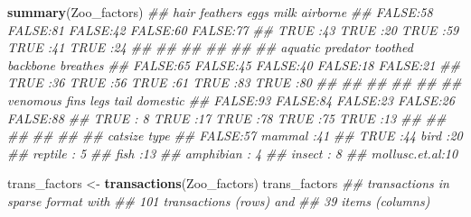 \documentclass[
  notitlepage]{book}
\newenvironment{Shaded}{\begin{snugshade}}{\end{snugshade}}
\newcommand{\CommentTok}[1]{\textcolor[rgb]{0.56,0.35,0.01}{\textit{#1}}}
\newcommand{\KeywordTok}[1]{\textcolor[rgb]{0.13,0.29,0.53}{\textbf{#1}}}
\newcommand{\NormalTok}[1]{#1}
\newcommand{\StringTok}[1]{\textcolor[rgb]{0.31,0.60,0.02}{#1}}
\begin{document}
\begin{Shaded}
\begin{Highlighting}[]
\KeywordTok{summary}\NormalTok{(Zoo\_factors)}
\CommentTok{\#\#     hair     feathers     eggs       milk     airborne }
\CommentTok{\#\#  FALSE:58   FALSE:81   FALSE:42   FALSE:60   FALSE:77  }
\CommentTok{\#\#  TRUE :43   TRUE :20   TRUE :59   TRUE :41   TRUE :24  }
\CommentTok{\#\#                                                        }
\CommentTok{\#\#                                                        }
\CommentTok{\#\#                                                        }
\CommentTok{\#\#                                                        }
\CommentTok{\#\#                                                        }
\CommentTok{\#\#   aquatic    predator   toothed    backbone   breathes }
\CommentTok{\#\#  FALSE:65   FALSE:45   FALSE:40   FALSE:18   FALSE:21  }
\CommentTok{\#\#  TRUE :36   TRUE :56   TRUE :61   TRUE :83   TRUE :80  }
\CommentTok{\#\#                                                        }
\CommentTok{\#\#                                                        }
\CommentTok{\#\#                                                        }
\CommentTok{\#\#                                                        }
\CommentTok{\#\#                                                        }
\CommentTok{\#\#   venomous     fins       legs       tail     domestic }
\CommentTok{\#\#  FALSE:93   FALSE:84   FALSE:23   FALSE:26   FALSE:88  }
\CommentTok{\#\#  TRUE : 8   TRUE :17   TRUE :78   TRUE :75   TRUE :13  }
\CommentTok{\#\#                                                        }
\CommentTok{\#\#                                                        }
\CommentTok{\#\#                                                        }
\CommentTok{\#\#                                                        }
\CommentTok{\#\#                                                        }
\CommentTok{\#\#   catsize              type   }
\CommentTok{\#\#  FALSE:57   mammal       :41  }
\CommentTok{\#\#  TRUE :44   bird         :20  }
\CommentTok{\#\#             reptile      : 5  }
\CommentTok{\#\#             fish         :13  }
\CommentTok{\#\#             amphibian    : 4  }
\CommentTok{\#\#             insect       : 8  }
\CommentTok{\#\#             mollusc.et.al:10}
\end{Highlighting}
\end{Shaded}

\begin{Shaded}
\begin{Highlighting}[]
\NormalTok{trans\_factors \textless{}{-}}\StringTok{ }\KeywordTok{transactions}\NormalTok{(Zoo\_factors)}
\NormalTok{trans\_factors}
\CommentTok{\#\# transactions in sparse format with}
\CommentTok{\#\#  101 transactions (rows) and}
\CommentTok{\#\#  39 items (columns)}
\end{Highlighting}
\end{Shaded}
\end{document}
